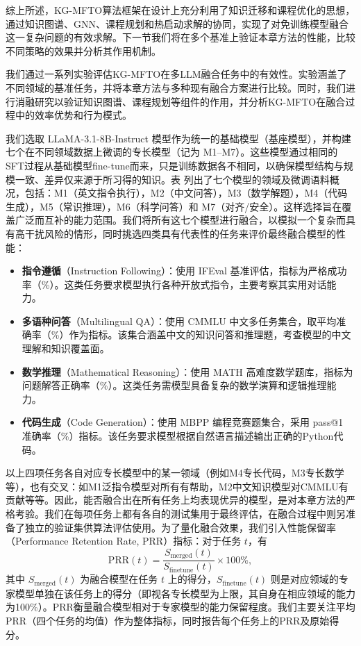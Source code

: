 \documentclass[../main.tex]{subfiles}
\begin{document}
综上所述，KG-MFTO算法框架在设计上充分利用了知识迁移和课程优化的思想，通过知识图谱、GNN、课程规划和热启动求解的协同，实现了对免训练模型融合这一复杂问题的有效求解。下一节我们将在多个基准上验证本章方法的性能，比较不同策略的效果并分析其作用机制。


我们通过一系列实验评估KG-MFTO在多LLM融合任务中的有效性。实验涵盖了不同领域的基准任务，并将本章方法与多种现有融合方案进行比较。同时，我们进行消融研究以验证知识图谱、课程规划等组件的作用，并分析KG-MFTO在融合过程中的效率优势和行为模式。



我们选取 LLaMA-3.1-8B-Instruct 模型作为统一的基础模型（基座模型），并构建七个在不同领域数据上微调的专长模型（记为 M1--M7）。这些模型通过相同的SFT过程从基础模型fine-tune而来，只是训练数据各不相同，以确保模型结构与规模一致、差异仅来源于所习得的知识。表 列出了七个模型的领域及微调语料概况，包括：M1（英文指令执行），M2（中文问答），M3（数学解题），M4（代码生成），M5（常识推理），M6（科学问答）和 M7（对齐/安全）。这样选择旨在覆盖广泛而互补的能力范围。我们将所有这七个模型进行融合，以模拟一个复杂而具有高干扰风险的情形，同时挑选四类具有代表性的任务来评价最终融合模型的性能：

\begin{itemize}[leftmargin=3\ccwd]
	\item \textbf{指令遵循}（Instruction Following）：使用 IFEval 基准评估，指标为严格成功率（\%）。这类任务要求模型执行各种开放式指令，主要考察其实用对话能力。
	\item \textbf{多语种问答}（Multilingual QA）：使用 CMMLU 中文多任务集合，取平均准确率（\%）作为指标。该集合涵盖中文的知识问答和推理题，考查模型的中文理解和知识覆盖面。
	\item \textbf{数学推理}（Mathematical Reasoning）：使用 MATH 高难度数学题库，指标为问题解答正确率（\%）。这类任务需模型具备复杂的数学演算和逻辑推理能力。
	\item \textbf{代码生成}（Code Generation）：使用 MBPP 编程竞赛题集合，采用 pass@1 准确率（\%）指标。该任务要求模型根据自然语言描述输出正确的Python代码。
\end{itemize}

以上四项任务各自对应专长模型中的某一领域（例如M4专长代码，M3专长数学等），也有交叉：如M1泛指令模型对所有有帮助，M2中文知识模型对CMMLU有贡献等等。因此，能否融合出在所有任务上均表现优异的模型，是对本章方法的严格考验。我们在每项任务上都有各自的测试集用于最终评估，在融合过程中则另准备了独立的验证集供算法评估使用。为了量化融合效果，我们引入性能保留率（Performance Retention Rate, PRR）指标：对于任务 $t$，有
\begin{equation}
	\text{PRR}(t) = \frac{S_{\text{merged}}(t)}{S_{\text{finetune}}(t)} \times 100\%,
\end{equation}
其中 $S_{\text{merged}}(t)$ 为融合模型在任务 $t$ 上的得分，$S_{\text{finetune}}(t)$ 则是对应领域的专家模型单独在该任务上的得分（即视各专长模型为上限，其自身在相应领域的能力为100\%）。PRR衡量融合模型相对于专家模型的能力保留程度。我们主要关注平均PRR（四个任务的均值）作为整体指标，同时报告每个任务上的PRR及原始得分。
\end{document}
